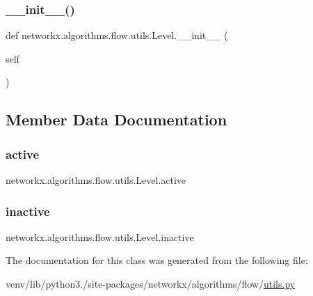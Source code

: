 \subsubsection{\texorpdfstring{\+\_\+\+\_\+init\+\_\+\+\_\+()}{\_\_init\_\_()}}
{\footnotesize\ttfamily def networkx.\+algorithms.\+flow.\+utils.\+Level.\+\_\+\+\_\+init\+\_\+\+\_\+ (\begin{DoxyParamCaption}\item[{}]{self }\end{DoxyParamCaption})}



\subsection{Member Data Documentation}
\mbox{\label{classnetworkx_1_1algorithms_1_1flow_1_1utils_1_1Level_a8275a6fc49b602ea7dc4d01f2cf2d528}} 
\subsubsection{\texorpdfstring{active}{active}}
{\footnotesize\ttfamily networkx.\+algorithms.\+flow.\+utils.\+Level.\+active}

\mbox{\label{classnetworkx_1_1algorithms_1_1flow_1_1utils_1_1Level_a69956183c04fdc30312c85f86a793ec2}} 
\subsubsection{\texorpdfstring{inactive}{inactive}}
{\footnotesize\ttfamily networkx.\+algorithms.\+flow.\+utils.\+Level.\+inactive}



The documentation for this class was generated from the following file\+:\begin{DoxyCompactItemize}
\item 
venv/lib/python3./site-\/packages/networkx/algorithms/flow/\hyperlink{networkx_2algorithms_2flow_2utils_8py}{utils.\+py}\end{DoxyCompactItemize}
